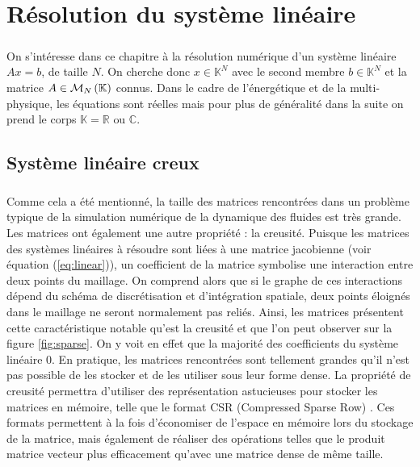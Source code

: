 \chapter{Résolution du système linéaire}

\paragraph{}
On s'intéresse dans ce chapitre à la résolution numérique d'un système linéaire $Ax = b$, de taille $N$.
On cherche donc $x\in\mathbb{K}^N$ avec le second membre $b\in\mathbb{K}^N$ et la matrice $A\in\mathcal{M}_{N}\left(\mathbb{K}\right)$ connus.
Dans le cadre de l'énergétique et de la multi-physique, les équations sont réelles mais pour plus de généralité dans la suite on prend le corps $\mathbb{K} = \mathbb{R}\textrm{ ou }\mathbb{C}$.


\section{Système linéaire creux}

	\paragraph{}
	Comme cela a été mentionné, la taille des matrices rencontrées dans un problème typique de la simulation numérique de la dynamique des fluides est très grande.
	Les matrices ont également une autre propriété : la creusité.
	Puisque les matrices des systèmes linéaires à résoudre sont liées à une matrice jacobienne (voir équation (\ref{eq:linear})), un coefficient de la matrice symbolise une interaction entre deux points du maillage.
	On comprend alors que si le graphe de ces interactions dépend du schéma de discrétisation et d'intégration spatiale, deux points éloignés dans le maillage ne seront normalement pas reliés.
	Ainsi, les matrices présentent cette caractéristique notable qu'est la creusité et que l'on peut observer sur la figure \ref{fig:sparse}.
	On y voit en effet que la majorité des coefficients du système linéaire  0.
	En pratique, les matrices rencontrées sont tellement grandes qu'il n'est pas possible de les stocker et de les utiliser sous leur forme dense.
	La propriété de creusité permettra d'utiliser des représentation astucieuses pour stocker les matrices en mémoire, telle que le format CSR (Compressed Sparse Row) \cite{Saad2003}.
	Ces formats permettent à la fois d'économiser de l'espace en mémoire lors du stockage de la matrice, mais également de réaliser des opérations telles que le produit matrice vecteur plus efficacement qu'avec une matrice dense de même taille.

